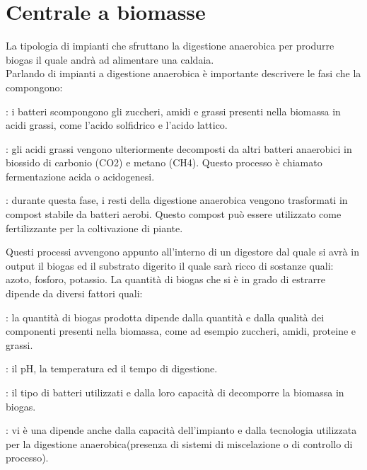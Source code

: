 \section{Centrale a biomasse}
La tipologia di impianti che sfruttano la digestione anaerobica per produrre biogas il quale andrà ad alimentare una caldaia.\\
Parlando di impianti a digestione anaerobica è importante descrivere le fasi che la compongono:\\
\begin{description}[labelindent=5mm]
    \item[$\bullet$ Produzione di acidi grassi]: i batteri scompongono gli zuccheri, amidi e grassi presenti nella biomassa in acidi grassi, come l'acido solfidrico e l'acido lattico.
    \item[$\bullet$ Fermentazione]: gli acidi grassi vengono ulteriormente decomposti da altri batteri anaerobici in biossido di carbonio (CO2) e metano (CH4). Questo processo è chiamato fermentazione acida o acidogenesi.
    \item[$\bullet$ Maturazione]: durante questa fase, i resti della digestione anaerobica vengono trasformati in compost stabile da batteri aerobi. Questo compost può essere utilizzato come fertilizzante per la coltivazione di piante.
\end{description}
Questi processi avvengono appunto all'interno di un digestore dal quale si avrà in output il biogas ed il substrato digerito il quale sarà ricco di sostanze quali: azoto, fosforo, potassio.
La quantità di biogas che si è in grado di estrarre dipende da diversi fattori quali:
\begin{description}[labelindent=5mm]
    \item[$\bullet$ Composizione chimica della biomassa]: la quantità di biogas prodotta dipende dalla quantità e dalla qualità dei componenti presenti nella biomassa, come ad esempio zuccheri, amidi, proteine e grassi.
    \item[$\bullet$ Condizioni ambientali]: il pH, la temperatura ed il tempo di digestione.
    \item[$\bullet$ Tipo di batteri]: il tipo di batteri utilizzati e dalla loro capacità di decomporre la biomassa in biogas.
    \item[$\bullet$ Dimensione e tecnologia dell'impianto]: vi è una dipende anche dalla capacità dell'impianto e dalla tecnologia utilizzata per la digestione anaerobica(presenza di sistemi di miscelazione o di controllo di processo).
\end{description}
